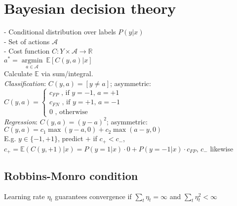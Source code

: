 \section*{Bayesian decision theory}
- Conditional distribution over labels $P(y|x)$\\
- Set of actions $\mathcal{A}$\\
- Cost function $C:Y\times \mathcal{A} \rightarrow \mathbb{R}$\\
$a^* = \underset{a \in \mathcal{A}}{\operatorname{argmin}} ~ \mathbb{E}[C(y,a)|x]$\\
Calculate $\mathbb{E}$ via sum/integral.\\
\emph{Classification}: $C(y,a) = [y \not = a]$; asymmetric: \\
$C(y,a) =
 \begin{cases}
 	c_{FP} \text{ , if $y=-1$, $a=+1$}\\
		c_{FN} \text{ , if $y=+1$, $a=-1$}\\
		0 \text{ , otherwise}
 \end{cases}$\\
 \emph{Regression}:  $C(y,a) = (y-a)^2$; asymmetric: $C(y,a) = c_1 \max(y-a,0) + c_2 \max(a-y,0)$\\
E.g. $y \in \{-1,+1\}$, predict $+$ if $c_+ < c_-$, $c_+ = \mathbb{E}(C(y, +1)|x) = P(y = 1|x) \cdot 0 + P(y = -1|x) \cdot c_{FP}$, $c_-$ likewise
\subsection*{Robbins-Monro condition}
Learning rate $\eta_t$ guarantees convergence if $\sum_t \eta_t = \infty$ and $\sum_t \eta_t^2 < \infty$



